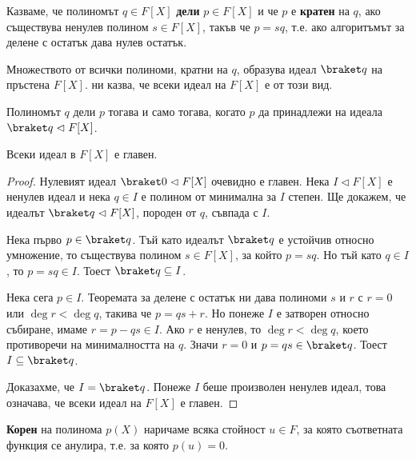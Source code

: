 \documentclass{../../common/topic}
\begin{document}
\begin{definition}
  Казваме, че полиномът \( q \in F[X] \) \textbf{дели} \( p \in F[X] \) и че \( p \) е \textbf{кратен} на \( q \), ако съществува ненулев полином \( s \in F[X] \), такъв че \( p = sq \), т.е. ако алгоритъмът за делене с остатък дава нулев остатък.

  Множеството от всички полиноми, кратни на \( q \), образува идеал \( \braket q \) на пръстена \( F[X] \).  ни казва, че всеки идеал на \( F[X] \) е от този вид.

  Полиномът \( q \) дели \( p \) тогава и само тогава, когато \( p \) да принадлежи на идеала \( \braket q \vartriangleleft F[X] \).
\end{definition}

\begin{theorem}\label{thm:polynomial_ideals_are_principal}
  Всеки идеал в \( F[X] \) е главен.
\end{theorem}
\begin{proof}
  Нулевият идеал \( \braket 0 \vartriangleleft F[X] \) очевидно е главен. Нека \( I \vartriangleleft F[X] \) е ненулев идеал и нека \( q \in I \) е полином от минимална за \( I \) степен. Ще докажем, че идеалът \( \braket q \vartriangleleft F[X] \), породен от \( q \), съвпада с \( I \).

  Нека първо \( p \in \braket q \). Тъй като идеалът \( \braket q \) е устойчив относно умножение, то съществува полином \( s \in F[X] \), за който \( p = sq \). Но тъй като \( q \in I \), то \( p = sq \in I \). Тоест \( \braket q \subseteq I \).

  Нека сега \( p \in I \). Теоремата за делене с остатък ни дава полиноми \( s \) и \( r \) с \( r = 0 \) или \( \deg r < \deg q \), такива че \( p = qs + r \). Но понеже \( I \) е затворен относно събиране, имаме \( r = p - qs \in I \). Ако \( r \) е ненулев, то \( \deg r < \deg q \), което противоречи на минималността на \( q \). Значи \( r = 0 \) и \( p = qs \in \braket q \). Тоест \( I \subseteq \braket q \).

  Доказахме, че \( I = \braket q \). Понеже \( I \) беше произволен ненулев идеал, това означава, че всеки идеал на \( F[X] \) е главен.
\end{proof}

\begin{definition}
  \textbf{Корен} на полинома \( p(X) \) наричаме всяка стойност \( u \in F \), за която съответната функция се анулира, т.е. за която \( p(u) = 0 \).
\end{definition}
\end{document}
